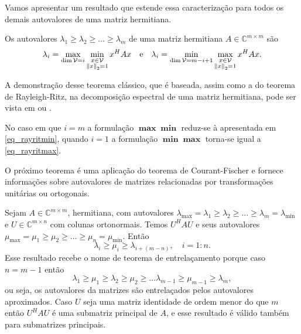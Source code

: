 Vamos apresentar um resultado que estende essa caracterização para todos os demais autovalores de uma matriz hermitiana.
\begin{teore}\label{teo_courantfisher}
Os autovalores $\lambda_1\geqslant\lambda_2\geqslant\ldots\geqslant\lambda_m$  de uma matriz hermitiana $A\in\mathbb{C}^{m\times m}$ são
\[
  \lambda_i=\max_{\dim\mathcal{V}=i}\min_{\begin{subarray}{c}x\in\mathcal{V}\\{\Vert x\Vert}_2=1\end{subarray}} x^HAx\quad\text{e}\quad\lambda_i=\min_{\dim\mathcal{V}=m-i+1}\max_{\begin{subarray}{c}x\in\mathcal{V}\\{\Vert x\Vert}_2=1\end{subarray}} x^HAx.
\]
\end{teore}
A demonstração desse teorema clássico, que é baseada, assim como a do teorema de Rayleigh-Ritz, na decomposição espectral de uma matriz hermitiana, pode ser vista em \cite[pág. 179]{HornJohnson87Matrix} ou \cite[pág. 550]{Meyer00Matrix}.
\begin{obs}\label{obs_courafisch}
No caso em que $i=m$ a formulação $\mathbf{\max\min}$ reduz-se à apresentada em \eqref{eq_rayritmin}, quando $i=1$ a formulação $\mathbf{\min\max}$ torna-se igual a \eqref{eq_rayritmax}.
\end{obs}

O pr\'{o}ximo teorema é uma aplicação do teorema de Courant-Fischer e fornece informações sobre autovalores de matrizes relacionadas por transformaç\~{o}es unitárias ou ortogonais.
\begin{teore}\label{teo_interlacing}
Sejam $A\in\mathbb{C}^{m\times m}$, hermitiana, com autovalores $\lambda_{\max}=\lambda_1\geqslant\lambda_2\geqslant\ldots\geqslant\lambda_m=\lambda_{\min}$ e $U\in\mathbb{C}^{m\times n}$  com colunas ortonormais. Temos $U^HAU$ e seus autovalores $\mu_{\max}=\mu_1\geqslant\mu_2\geqslant\ldots\geqslant\mu_n=\mu_{\min}$. Então
\[
\lambda_i\geqslant \mu_i \geqslant \lambda_{i+(m-n)}, \quad i=1:n.
\]
Esse resultado recebe o nome de teorema de entrelaçamento porque caso $n=m-1$ então
\[
\lambda_1\geqslant\mu_1\geqslant\lambda_2\geqslant\mu_2\geqslant\ldots\lambda_{m-1}\geqslant\mu_{m-1}\geqslant\lambda_m,
\]
ou seja, os autovalores da matrizes são entrelaçados pelos autovalores aproximados. Caso $U$ seja uma matriz identidade de ordem menor do que $m$ então $U^HAU$ é uma submatriz principal de $A$, e esse resultado é válido também para submatrizes principais.
\end{teore}

